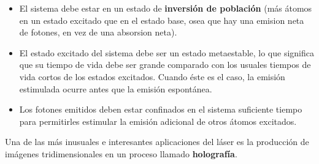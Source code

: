 \documentclass[10pt]{article}
\begin{document}
\begin{itemize}
	\item El sistema debe estar en un estado de \textbf{inversión de población} (más átomos en un estado
excitado que en el estado base, osea que hay una emision neta de fotones, en vez de una absorsion neta).
	\item El estado excitado del sistema debe ser un estado metaestable, lo que significa que su tiempo
de vida debe ser grande comparado con los usuales tiempos de vida cortos de los estados
excitados. Cuando éste es el caso, la emisión estimulada ocurre antes que la emisión
espontánea.
	\item Los fotones emitidos deben estar confinados en el sistema suficiente tiempo para
permitirles estimular la emisión adicional de otros átomos excitados. 
\end{itemize}

Una de las más inusuales e interesantes aplicaciones del láser es la producción de imágenes
tridimensionales en un proceso llamado \textbf{holografía}.
\end{document}
